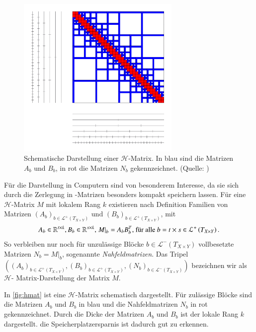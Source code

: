     \begin{figure}[t]
      \includegraphics[width=0.7\textwidth]{img/h-matrix.png}
      \caption{Schematische Darstellung einer $\mathcal{H}$-Matrix. In blau sind die Matrizen $A_b$ und $B_b$, in rot die Matrizen $N_b$ gekennzeichnet. (Quelle: \citet{h2slides})}
      \label{fig:hmat}
    \end{figure}


    Für die Darstellung in Computern sind \hmat von besonderem Interesse, da sie sich durch die Zerlegung in \Rk-Matrizen besonders kompakt speichern lassen. Für eine $\mathcal{H}$-Matrix
    $M$ mit lokalem Rang $k$ existieren nach Definition Familien von Matrizen $\left(A_b\right)_{b \in \mathcal{L}^+\left(T_{X \times Y}\right)} \text{ und } \left(B_b\right)_{b \in \mathcal{L}^+\left(T_{X \times Y}\right)}$, mit 
    \begin{equation*}
      A_b \in \mathbb{R}^{t \times k}, B_b \in \mathbb{R}^{s \times k}, \left. M \right|_b = A_bB_b^T \text{, für alle } b = t \times s \in \mathcal{L}^+\left(T_{X \times Y}\right).
    \end{equation*}
    So verbleiben nur noch für unzulässige Blöcke $b \in \mathcal{L}^-\left(T_{X \times Y}\right)$ vollbesetzte Matrizen $N_b = M|_b$, sogenannte \textit{Nahfeldmatrizen}.
    Das Tripel $\left( \left(A_b\right)_{b \in \mathcal{L}^+\left(T_{X \times Y}\right)} , \left(B_b\right)_{b \in \mathcal{L}^+\left(T_{X \times Y}\right)} , \left(N_b\right)_{b \in \mathcal{L}^-\left(T_{X \times Y}\right)} \right)$ bezeichnen wir als $\mathcal{H}$-
    Matrix-Darstellung der Matrix $M$. \citep{nichtlokop} 
    
    In \autoref{fig:hmat} ist eine $\mathcal{H}$-Matrix schematisch dargestellt. Für zulässige Blöcke sind die Matrizen $A_b$ und $B_b$ in blau 
    und die Nahfeldmatrizen $N_b$ in rot gekennzeichnet. Durch die Dicke der Matrizen $A_b$ und $B_b$ ist der lokale Rang $k$ dargestellt. die Speicherplatzersparnis ist dadurch gut zu erkennen.
    
